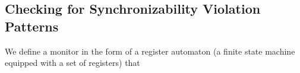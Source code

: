 

\subsection{Checking for Synchronizability Violation Patterns}

We define a monitor in the form of a register automaton (a finite state machine equipped with a set of registers)
that 